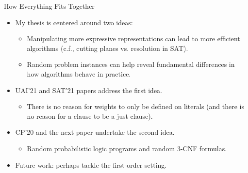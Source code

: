 \documentclass{beamer}
\begin{document}
\begin{frame}{How Everything Fits Together}
  \begin{itemize}
  \item My thesis is centered around two ideas:
    \begin{itemize}
    \item Manipulating more expressive representations can lead to more
      efficient algorithms (c.f., cutting planes vs. resolution in SAT).
    \item Random problem instances can help reveal fundamental differences in
      how algorithms behave in practice.
    \end{itemize}
  \item UAI'21 and SAT'21 papers address the first idea.
    \begin{itemize}
    \item There is no reason for weights to only be defined on literals (and
      there is no reason for a clause to be a just clause).
    \end{itemize}
  \item CP'20 and the next paper undertake the second idea.
    \begin{itemize}
    \item Random probabilistic logic programs and random 3-CNF formulas.
    \end{itemize}
  \item Future work: perhaps tackle the first-order setting.
  \end{itemize}
\end{frame}
\end{document}
